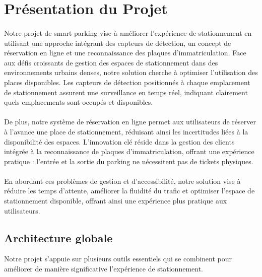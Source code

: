 \section{Présentation du Projet}

\paragraph*{}
Notre projet de smart parking vise à améliorer l'expérience de stationnement en utilisant une approche intégrant des capteurs de détection, un concept de réservation en ligne et une reconnaissance des plaques d'immatriculation.
Face aux défis croissants de gestion des espaces de stationnement dans des environnements urbains denses, notre solution cherche à optimiser l'utilisation des places disponibles. 
Les capteurs de détection positionnés à chaque emplacement de stationnement assurent une surveillance en temps réel, indiquant clairement quels emplacements sont occupés et disponibles. 

\paragraph*{}
De plus, notre système de réservation en ligne permet aux utilisateurs de réserver à l'avance une place de stationnement, réduisant ainsi les incertitudes liées à la disponibilité des espaces. 
L'innovation clé réside dans la gestion des clients intégrée à la reconnaissance de plaques d'immatriculation, offrant une expérience pratique : l'entrée et la sortie du parking ne nécessitent pas de tickets physiques. 

\paragraph*{}
En abordant ces problèmes de gestion et d'accessibilité, notre solution vise à réduire les temps d'attente, améliorer la fluidité du trafic et optimiser l'espace de stationnement disponible, offrant ainsi une expérience plus pratique aux utilisateurs.

\clearpage

\subsection*{Architecture globale}

Notre projet s'appuie sur plusieurs outils essentiels qui se combinent pour améliorer de manière significative l'expérience de stationnement.

